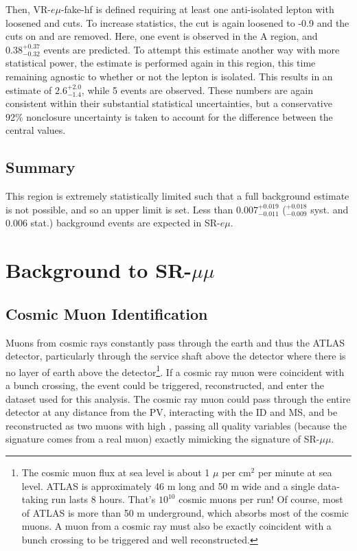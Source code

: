 Then, VR-$e\mu$-fake-hf is defined requiring at least one anti-isolated lepton with loosened \pt and \absdz cuts. To increase statistics, the \dpt cut is again loosened to -0.9 and the cuts on \nprecision and \nphi are removed. Here, one event is observed in the A region, and $0.38^{+0.37}_{-0.32}$ events are predicted. To attempt this estimate another way with more statistical power, the estimate is performed again in this region, this time remaining agnostic to whether or not the lepton is isolated. This results in an estimate of $2.6^{+2.0}_{-1.4}$, while 5 events are observed. These numbers are again consistent within their substantial statistical uncertainties, but a conservative 92\% nonclosure uncertainty is taken to account for the difference between the central values.

\subsection{Summary}
This region is extremely statistically limited such that a full background estimate is not possible, and so an upper limit is set. Less than 
$0.007^{+0.019}_{-0.011}$ ($^{+0.018}_{-0.009}$ syst. and 0.006 stat.) background events are expected in SR-$e\mu$.


\FloatBarrier
\section{Background to SR-$\mu\mu$}

\subsection{Cosmic Muon Identification}
\label{sec:cosmics}
Muons from cosmic rays constantly pass through the earth and thus the \ac{ATLAS} detector, particularly through the service shaft above the detector where there is no layer of earth above the detector\footnote{The cosmic muon flux at sea level is about 1 $\mu$ per cm$^2$ per minute at sea level. ATLAS is approximately 46 m long and 50 m wide and a single data-taking run lasts 8 hours. That's $10^{10}$ cosmic muons per run! Of course, most of \ac{ATLAS} is more than 50 m underground, which absorbs most of the cosmic muons. A muon from a cosmic ray must also be exactly coincident with a bunch crossing to be triggered and well reconstructed. }. If a cosmic ray muon were coincident with a bunch crossing, the event could be triggered, reconstructed, and enter the dataset used for this analysis. The cosmic ray muon could pass through the entire detector at any distance from the \ac{PV}, interacting with the \ac{ID} and \ac{MS}, and be reconstructed as two muons with high \absdz, passing all quality variables (because the signature comes from a real muon) exactly mimicking the signature of SR-$\mu\mu$. 

